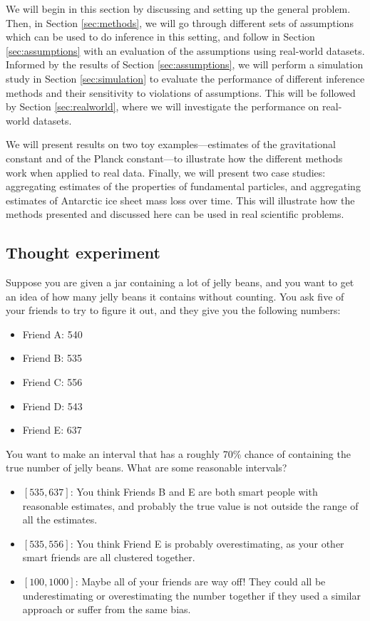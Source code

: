 \documentclass[letterpaper,12pt]{article}
\begin{document}
We will begin in this section by discussing and setting up the general problem. Then, in Section \ref{sec:methods}, we will go through different sets of assumptions which can be used to do inference in this setting, and follow in Section \ref{sec:assumptions} with an evaluation of the assumptions using real-world datasets. Informed by the results of Section \ref{sec:assumptions}, we will perform a simulation study in Section \ref{sec:simulation} to evaluate the performance of different inference methods and their sensitivity to violations of assumptions. This will be followed by Section \ref{sec:realworld}, where we will investigate the performance on real-world datasets.

We will present results on two toy examples---estimates of the gravitational constant and of the Planck constant---to illustrate how the different methods work when applied to real data. Finally, we will present two case studies: aggregating estimates of the properties of fundamental particles, and aggregating estimates of Antarctic ice sheet mass loss over time. This will illustrate how the methods presented and discussed here can be used in real scientific problems.


\subsection{Thought experiment}\label{thought-experiment}

Suppose you are given a jar containing a lot of jelly beans, and you want to get an idea of how many jelly beans it contains without counting. You ask five of your friends to try to figure it out, and they give you the following numbers:

\begin{itemize}

\item
  Friend A: 540
\item
  Friend B: 535
\item
  Friend C: 556
\item
  Friend D: 543
\item
  Friend E: 637
\end{itemize}

You want to make an interval that has a roughly 70\% chance of containing the true number of jelly beans. What are some reasonable intervals?

\begin{itemize}

\item
  $[535, 637]$: You think Friends B and E are both smart people with reasonable estimates, and probably the true value is not outside the range of all the estimates.
\item
  $[535, 556]$: You think Friend E is probably overestimating, as your other smart friends are all clustered together.
\item
  $[100, 1000]$: Maybe all of your friends are way off! They could all be underestimating or overestimating the number together if they used a similar approach or suffer from the same bias.
\end{itemize}
\end{document}
